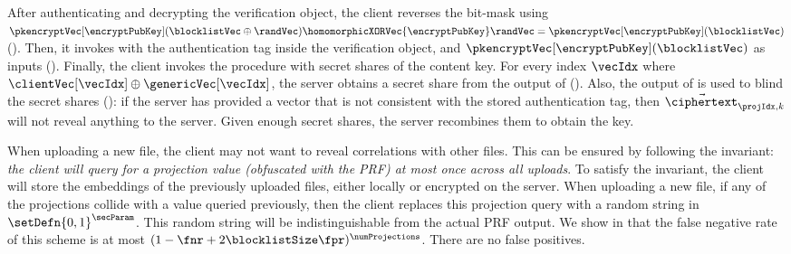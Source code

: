 After authenticating and decrypting the verification object, the client reverses the bit-mask using $\pkencryptVec[\encryptPubKey](\blocklistVec \oplus \randVec) \homomorphicXORVec{\encryptPubKey} \randVec = \pkencryptVec[\encryptPubKey](\blocklistVec)$ ().
Then, it invokes \evaFunc with the authentication tag inside the verification object, and $\pkencryptVec[\encryptPubKey](\blocklistVec)$ as inputs (). Finally, the client invokes the \blindedHD procedure with secret shares of the content key. 
For every index $\vecIdx$ where $\clientVec[\vecIdx] \oplus \genericVec[\vecIdx]$, the server obtains a secret share from the output of \blindedHD (). Also, the output of \evaFunc is used to blind the secret shares (): if the server has provided a vector that is not consistent with the stored authentication tag, then $\vec{\ciphertext}_{\projIdx, k}$ will not reveal anything to the server. 
Given enough secret shares, the server recombines them to obtain the key.  









%
When uploading a new file, the client may not want to reveal correlations with other files. This can be ensured by following the invariant: \emph{the client will query \cuckooTable for a projection value (obfuscated with the PRF) at most once across all uploads}. To satisfy the invariant, the client will store the embeddings of the previously uploaded files, either locally or encrypted on the server. When uploading a new file, if any of the projections collide with a value queried previously, then the client replaces this projection query with a random string in $\setDefn{0,1}^{\secParam}$. This random string will be indistinguishable from the actual PRF output. 
We show in  that the false negative rate of this scheme is at most $(1 - \fnr + 2\blocklistSize \fpr)^{\numProjections}$. 
There are no false positives. 

